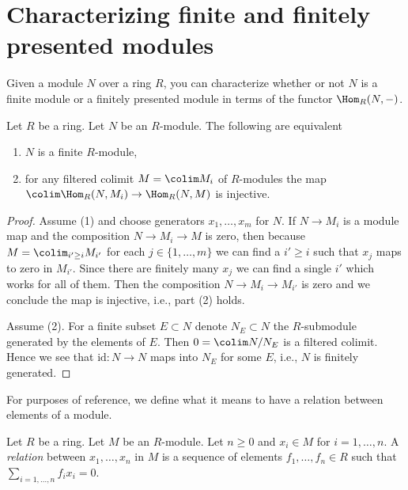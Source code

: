 \section{Characterizing finite and finitely presented modules}
\label{section-colim-and-hom}

\noindent
Given a module $N$ over a ring $R$, you can characterize whether or not
$N$ is a finite module or a finitely presented module
in terms of the functor $\Hom_R(N, -)$.

\begin{lemma}
\label{lemma-characterize-finite-module-hom}
Let $R$ be a ring. Let $N$ be an $R$-module. The following are equivalent
\begin{enumerate}
\item $N$ is a finite $R$-module,
\item for any filtered colimit $M = \colim M_i$ of $R$-modules the map
$\colim \Hom_R(N, M_i) \to \Hom_R(N, M)$ is injective.
\end{enumerate}
\end{lemma}

\begin{proof}
Assume (1) and choose generators $x_1, \ldots, x_m$ for $N$.
If $N \to M_i$ is a module map and the composition
$N \to M_i \to M$ is zero, then because $M = \colim_{i' \geq i} M_{i'}$
for each $j \in \{1, \ldots, m\}$ we can find a $i' \geq i$ such that
$x_j$ maps to zero in $M_{i'}$. Since there are finitely many
$x_j$ we can find a single $i'$ which works for all of them.
Then the composition $N \to M_i \to M_{i'}$ is zero and we conclude
the map is injective, i.e., part (2) holds.

\medskip\noindent
Assume (2). For a finite subset $E \subset N$ denote $N_E \subset N$
the $R$-submodule generated by the elements of $E$. Then
$0 = \colim N/N_E$ is a filtered colimit. Hence we see that
$\text{id} : N \to N$ maps into $N_E$ for some $E$, i.e., $N$
is finitely generated.
\end{proof}

\noindent
For purposes of reference, we define what it means to have a relation
between elements of a module.

\begin{definition}
\label{definition-relation}
Let $R$ be a ring. Let $M$ be an $R$-module.
Let $n \geq 0$ and $x_i \in M$ for $i = 1, \ldots, n$.
A {\it relation} between $x_1, \ldots, x_n$ in $M$ is a
sequence of elements $f_1, \ldots, f_n \in R$ such that
$\sum_{i = 1, \ldots, n} f_i x_i = 0$.
\end{definition}

